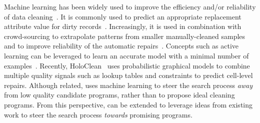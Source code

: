  Machine learning has been widely used to improve the efficiency and/or reliability of data cleaning~\cite{DBLP:journals/pvldb/YakoutENOI11,yakout2013don,gokhale2014corleone}.
It is commonly used to predict an appropriate replacement attribute value for dirty records~\cite{yakout2013don}.
Increasingly, it is used in combination with crowd-sourcing to extrapolate patterns from smaller manually-cleaned samples~\cite{gokhale2014corleone,DBLP:journals/pvldb/YakoutENOI11} and to improve reliability of the automatic repairs~\cite{DBLP:journals/pvldb/YakoutENOI11}.
Concepts such as active learning can be leveraged to learn an accurate model with a minimal number of examples~\cite{DBLP:journals/pvldb/MozafariSFJM14}.
Recently, HoloClean~\cite{rekatsinas2017holoclean} uses probabilistic graphical models to combine multiple quality signals such as lookup tables and constraints to predict cell-level repairs.
Although related, \sys uses machine learning to steer the search process {\it away} from low quality candidate programs, rather than to propose ideal cleaning programs.  From this perspective, \sys can be extended to leverage ideas from existing work to steer the search process {\it towards} promising programs.  



